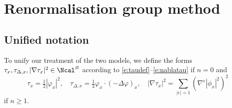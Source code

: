 \chapter{Renormalisation group method}




\section{Unified notation}

To unify our treatment of the two models,
we define the forms $\tau_x, \tau_{\Delta,x}, |\nabla\tau_x|^2 \in \Ncal^\varnothing$ according
to \eqref{e:taudef}--\eqref{e:nablatau} if $n = 0$ and
\begin{equation}
\label{e:tauphi}
\tau_x = \tfrac{1}{2} |\varphi_x|^2,
	\quad
\tau_{\Delta,x} = \tfrac{1}{2} \varphi_x \cdot (-\Delta \varphi)_x,
	\quad
|\nabla\tau_x|^2 = \sum_{|e|=1} (\nabla^e |\phi_x|^2)^2
\end{equation}
if $n \ge 1$.

